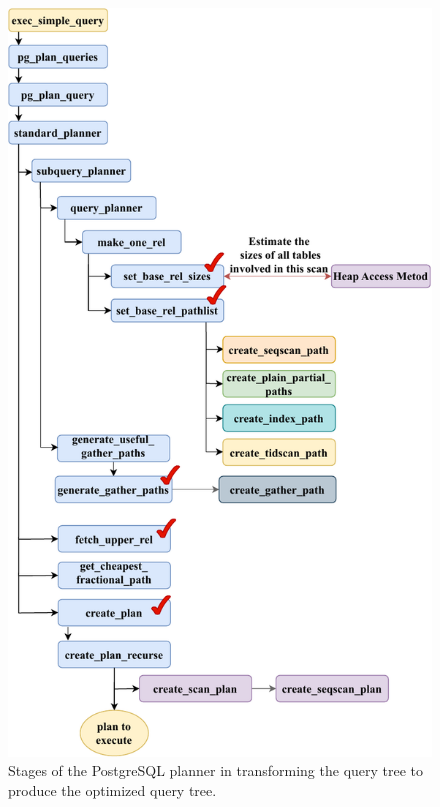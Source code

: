 \begin{figure}[hbt!]
\centering
\includegraphics[width=0.82\linewidth]{img/pg_planner.pdf}
\caption[Stages of the PostgreSQL planner]{Stages of the PostgreSQL planner in transforming the query tree to produce the optimized query tree. \cite{huang_understand_2024}}
\label{fig:pg-planner}
\end{figure}